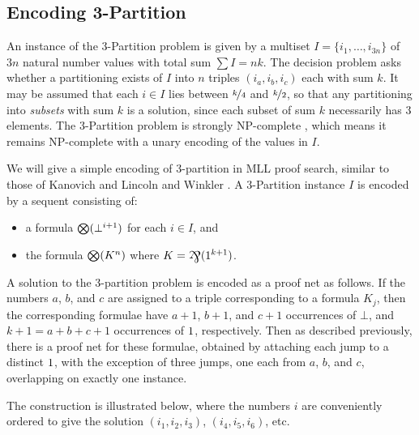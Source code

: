 \documentclass{lmcs}
\let\capsabbrev=\uppercase
\begin{document}

\subsection*{Encoding 3-Partition}

An instance of the 3-Partition problem is given by a multiset $I=\{i_1,\dotsc,i_{3n}\}$ of $3n$ natural number values with total sum $\sum I=nk$. The decision problem asks whether a partitioning exists of $I$ into $n$ triples $(i_a,i_b,i_c)$ each with sum $k$. It may be assumed that each $i\in I$ lies between $\nicefrac k4$ and $\nicefrac k2$, so that any partitioning into \emph{subsets} with sum $k$ is a solution, since each subset of sum $k$ necessarily has $3$ elements. The 3-Partition problem is strongly \capsabbrev{np}-complete \cite{GareyAndJohnson}, which means it remains \capsabbrev{np}-complete with a unary encoding of the values in $I$.

We will give a simple encoding of 3-partition in MLL proof search, similar to those of Kanovich \cite{Kanovich-1992} and Lincoln and Winkler \cite{Lincoln-Winkler-1994}. A 3-Partition instance $I$ is encoded by a sequent consisting of:
\begin{itemize}
	\item a formula $\bigotimes(\bot^{i+1})$ for each $i\in I$, and
	\item the formula $\bigotimes(K^n)$ where $K=\bigparr(\1^{k+1})$.
\end{itemize}
A solution to the 3-partition problem is encoded as a proof net as follows. If the numbers $a$, $b$, and $c$ are assigned to a triple corresponding to a formula $K_j$, then the corresponding formulae have $a+1$, $b+1$, and $c+1$ occurrences of $\bot$, and $k+1=a+b+c+1$ occurrences of $1$, respectively. Then as described previously, there is a proof net for these formulae, obtained by attaching each jump to a distinct $1$, with the exception of three jumps, one each from $a$, $b$, and $c$, overlapping on exactly one instance.

The construction is illustrated below, where the numbers $i$ are conveniently ordered to give the solution $(i_1,i_2,i_3)$, $(i_4,i_5,i_6)$, etc.
\end{document}
